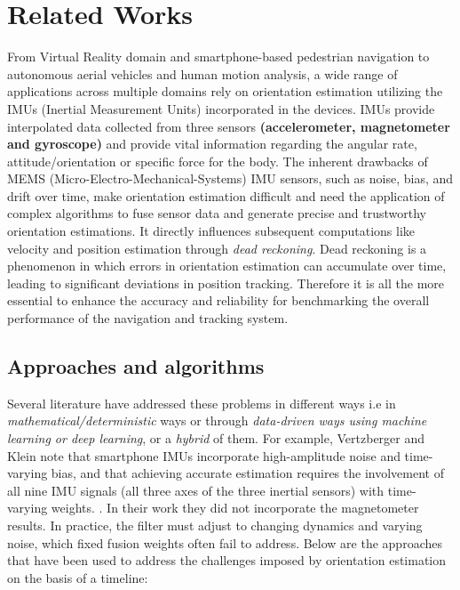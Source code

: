 \documentclass{iutbscthesis}
\begin{document}
\chapter{Related Works}\label{chapter:RelatedWorks}


From Virtual Reality domain and smartphone-based pedestrian navigation to auto\-nomous aerial vehicles and human motion analysis, a wide range of applications across multiple domains rely on orientation estimation utilizing the IMUs (Inertial Measurement Units) incorporated in the devices. IMUs provide interpolated data collected from three sensors \textbf{(accelerometer, magnetometer and gyroscope)} and provide vital information regarding the angular rate, attitude/orientation or specific force for the body. The inherent drawbacks of MEMS (Micro-Electro-Mechanical-Systems) IMU sensors, such as noise, bias, and drift over time, make orientation estimation difficult and need the application of complex algorithms to fuse sensor data and generate precise and trustworthy orientation estimations. It directly influences subsequent computations like velocity and position estimation through \textit{dead reckoning}. Dead reckoning is a phenomenon in which errors in orientation estimation can accumulate over time, leading to significant deviations in position tracking. Therefore it is all the more essential to enhance the accuracy and reliability for benchmarking the overall performance of the navigation and tracking system.
 

\section{Approaches and algorithms}
Several literature have addressed these problems in different ways i.e in \textit{mathematical/deterministic} ways or through \textit{data-driven ways using machine learning or deep learning}, or a \textit{hybrid} of them. For example, Vertzberger and Klein note that smartphone IMUs incorporate high-amplitude noise and time-varying bias, and that achieving accurate estimation requires the involvement of all nine IMU signals (all three axes of the three inertial sensors) with time-varying weights. \cite{vertzberger2022adaptive}. In their work they did not incorporate the magnetometer results. In practice, the filter must adjust to changing dynamics and varying noise, which fixed fusion weights often fail to address. Below are the approaches that have been used to address the challenges imposed by orientation estimation on the basis of a timeline:
\end{document}
